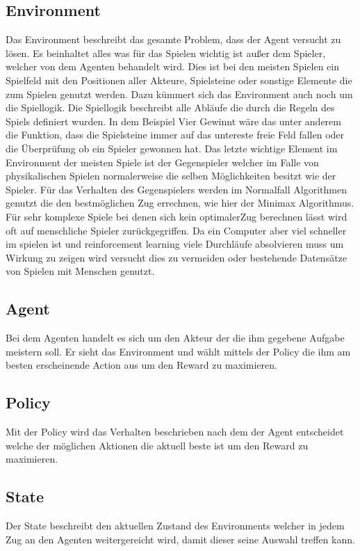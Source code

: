 \subsection{Environment}
Das Environment beschreibt das gesamte Problem, dass der Agent versucht zu lösen. Es beinhaltet alles was für das Spielen wichtig ist außer dem Spieler, welcher von dem Agenten behandelt wird.  Dies ist bei den meisten Spielen ein Spielfeld mit den Positionen aller Akteure, Spielsteine oder sonstige Elemente die zum Spielen genutzt werden. Dazu kümmert sich das Environment auch noch um die Spiellogik. Die Spiellogik beschreibt alle Abläufe die durch die Regeln des Spiels definiert wurden. In dem Beispiel Vier Gewinnt wäre das unter anderem die Funktion, dass die Spielsteine immer auf das untereste freie Feld fallen oder die Überprüfung ob ein Spieler gewonnen hat. Das letzte wichtige Element im Environment der meisten Spiele ist der Gegenspieler welcher im Falle von physikalischen Spielen normalerweise die selben Möglichkeiten besitzt wie der Spieler. Für das Verhalten des Gegenspielers werden im Normalfall Algorithmen genutzt die den bestmöglichen Zug errechnen, wie hier der Minimax Algorithmus. Für sehr komplexe Spiele bei denen sich kein optimalerZug berechnen lässt wird oft auf menschliche Spieler zurückgegriffen. Da ein Computer aber viel schneller im spielen ist und reinforcement learning viele Durchläufe absolvieren muss um Wirkung zu zeigen wird versucht dies zu vermeiden oder bestehende Datensätze von Spielen mit Menschen genutzt.\\


\subsection{Agent}
Bei dem Agenten handelt es sich um den Akteur der die ihm gegebene Aufgabe meistern soll. Er sieht das Environment und wählt mittels der Policy die ihm am besten erscheinende Action aus um den Reward zu maximieren.\\

\subsection{Policy}
Mit der Policy wird das Verhalten beschrieben nach dem der Agent entscheidet welche der möglichen Aktionen die aktuell beste ist um den Reward zu maximieren.\\

\subsection{State}
Der State beschreibt den aktuellen Zustand des Environments welcher in jedem Zug  an den Agenten weitergereicht wird, damit dieser seine Auswahl treffen kann. 

